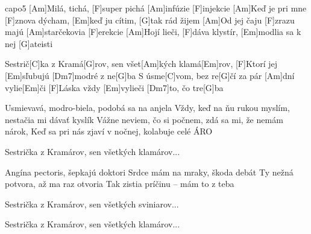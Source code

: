 \hfill capo5
[Am]Milá, tichá, [F]super pichá [Am]infúzie [F]injekcie
[Am]Keď je pri mne [F]znova dýcham, [Em]keď ju cítim, [G]tak rád žijem
[Am]Od jej čaju [F]zrazu majú [Am]starčekovia [F]erekcie
[Am]Hojí lieči, [F]dáva klystír, [Em]modlia sa k nej [G]ateisti

Sestrič[C]ka z Kramá[G]rov, sen všet[Am]kých klamá[Em]rov,
[F]Ktorí jej [Em]sľubujú [Dm7]modré z ne[G]ba
S úsme[C]vom, bez re[G]\null čí za pár [Am]dní vylie[Em]\null či
[F]Láska vždy [Em]vylieči [Dm7]to, čo tre[G]ba

Usmievavá, modro-biela, podobá sa na anjela
Vždy, keď na ňu rukou myslím, nestačia mi dávať kyslík
Vážne neviem, čo si počnem, zdá sa mi, že nemám nárok,
Keď sa pri nás zjaví v nočnej, kolabuje celé ÁRO

Sestrička z Kramárov, sen všetkých klamárov...

Angína pectoris, šepkajú doktori
Srdce mám na mraky, škoda debát
Ty nežná potvora, až ma raz otvoria
Tak zistia príčinu – mám to z teba

Sestrička z Kramárov, sen všetkých sviniarov...

Sestrička z Kramárov, sen všetkých klamárov...



